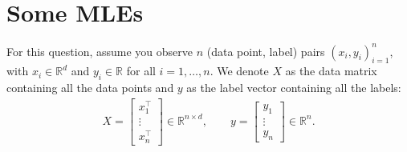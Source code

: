 \documentclass{article}
\newcommand{\Question}[1]{\Large \section{ #1 } \normalsize}
\begin{document}
\newpage
\Question{Some MLEs}
For this question, assume you observe $n$ (data point, label) pairs $(x_i, y_i)_{i=1}^n$, with $x_i\in \mathbb R^d$ and $y_i\in\mathbb R$ for all $i=1,\ldots, n$. We denote $X$ as the data matrix containing all the data points and $y$ as the label vector containing all the labels:
\begin{align*}
    X = \begin{bmatrix} x_1^\top \\\vdots \\ x_n^\top \end{bmatrix} \in \mathbb R^{n\times d}, \qquad y = \begin{bmatrix} y_1 \\ \vdots \\ y_n\end{bmatrix}\in\mathbb R^n.
\end{align*}
\end{document}
